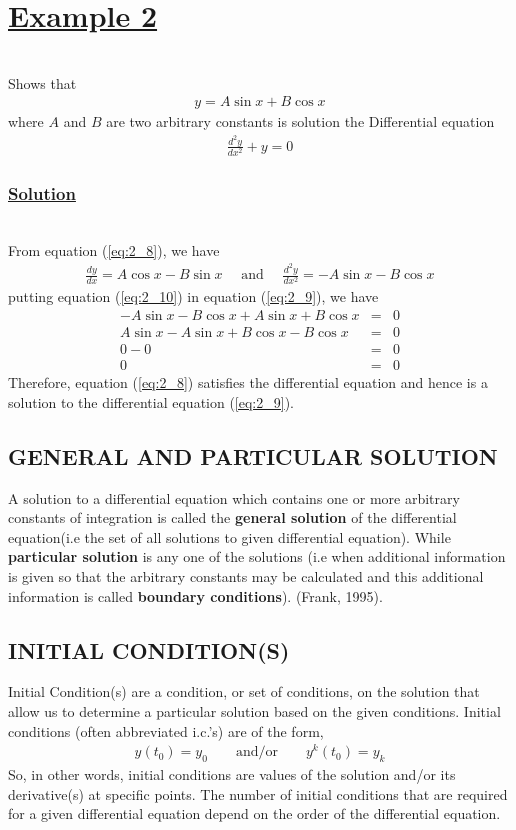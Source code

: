 \documentclass[11pt]{report}
\newcommand{\ubt}[1]{\textbf{\underline{#1}}}
\newcommand{\sps}{\\[0.2cm]}
\newcommand{\spn}[1]{\\[#1cm]}
\newcommand{\refn}[1]{(\ref{#1})}
\newcommand{\refx}[1]{\refn{eq:#1}}
\newcommand{\bt}[1]{\textbf{#1}}
\newcommand{\example}[1]{\section*{\ubt{Example #1}}{~}\spn{-1}}
\newcommand{\solution}{\subsubsection{\ubt{Solution}}{~}\spn{-1}}
\begin{document}
	\example{2}
	Shows that
	\begin{eqnarray}
		y=A\sin x +B\cos x \label{eq:2_8}
	\end{eqnarray}
	where $A$ and $B$ are two arbitrary constants is solution the Differential equation
	\begin{eqnarray}
		\frac{d^2y}{dx^2} + y = 0\label{eq:2_9}
	\end{eqnarray}
	
	\solution
	From equation \refx{2_8}, we have
	\begin{eqnarray}
		\frac{dy}{dx} = A\cos x - B\sin x\quad \text{ and } \quad \frac{d^2y}{dx^2} = -A\sin x - B\cos x \label{eq:2_10}
	\end{eqnarray}
	putting equation \refx{2_10} in equation \refx{2_9}, we have
	\begin{eqnarray*}
		-A\sin x - B\cos x + A\sin x + B\cos x &=& 0\sps
		A\sin x - A\sin x + B\cos x - B\cos x &=& 0\sps
		0 - 0 &=& 0 \sps
		0 &=& 0
	\end{eqnarray*}
	Therefore, equation \refx{2_8} satisfies the differential equation and hence is a solution to the differential equation \refx{2_9}.

	\subsection{GENERAL AND PARTICULAR SOLUTION}
	A solution to a differential equation which contains one or more arbitrary constants of integration is called the \bt{general solution} of the differential equation(i.e the set of all solutions to given differential equation). While \bt{particular solution} is any one of the solutions (i.e when additional information is given so that the arbitrary constants may be calculated and this additional information is called \bt{boundary conditions}). (Frank, 1995).
	
	\subsection{INITIAL CONDITION(S)}
	Initial Condition(s) are a condition, or set of conditions, on the solution that allow us to determine a particular solution based on the given conditions. Initial conditions (often abbreviated i.c.’s) are of the form,
	\begin{eqnarray}
		y(t_0) = y_0 \qquad \text{and/or} \qquad y^{k}(t_0) = y_k
	\end{eqnarray}
	So, in other words, initial conditions are values of the solution and/or its derivative(s) at specific points. The number of initial conditions that are required for a given differential equation depend on the order of the differential equation. 
	
\end{document}
